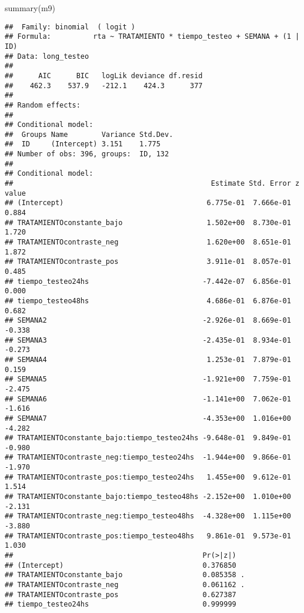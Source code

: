 \documentclass[
]{article}
\newenvironment{Shaded}{\begin{snugshade}}{\end{snugshade}}
\newcommand{\FunctionTok}[1]{\textcolor[rgb]{0.00,0.00,0.00}{#1}}
\newcommand{\NormalTok}[1]{#1}
\begin{document}
\begin{Shaded}
\begin{Highlighting}[]
\FunctionTok{summary}\NormalTok{(m9)}
\end{Highlighting}
\end{Shaded}

\begin{verbatim}
##  Family: binomial  ( logit )
## Formula:          rta ~ TRATAMIENTO * tiempo_testeo + SEMANA + (1 | ID)
## Data: long_testeo
## 
##      AIC      BIC   logLik deviance df.resid 
##    462.3    537.9   -212.1    424.3      377 
## 
## Random effects:
## 
## Conditional model:
##  Groups Name        Variance Std.Dev.
##  ID     (Intercept) 3.151    1.775   
## Number of obs: 396, groups:  ID, 132
## 
## Conditional model:
##                                               Estimate Std. Error z value
## (Intercept)                                  6.775e-01  7.666e-01   0.884
## TRATAMIENTOconstante_bajo                    1.502e+00  8.730e-01   1.720
## TRATAMIENTOcontraste_neg                     1.620e+00  8.651e-01   1.872
## TRATAMIENTOcontraste_pos                     3.911e-01  8.057e-01   0.485
## tiempo_testeo24hs                           -7.442e-07  6.856e-01   0.000
## tiempo_testeo48hs                            4.686e-01  6.876e-01   0.682
## SEMANA2                                     -2.926e-01  8.669e-01  -0.338
## SEMANA3                                     -2.435e-01  8.934e-01  -0.273
## SEMANA4                                      1.253e-01  7.879e-01   0.159
## SEMANA5                                     -1.921e+00  7.759e-01  -2.475
## SEMANA6                                     -1.141e+00  7.062e-01  -1.616
## SEMANA7                                     -4.353e+00  1.016e+00  -4.282
## TRATAMIENTOconstante_bajo:tiempo_testeo24hs -9.648e-01  9.849e-01  -0.980
## TRATAMIENTOcontraste_neg:tiempo_testeo24hs  -1.944e+00  9.866e-01  -1.970
## TRATAMIENTOcontraste_pos:tiempo_testeo24hs   1.455e+00  9.612e-01   1.514
## TRATAMIENTOconstante_bajo:tiempo_testeo48hs -2.152e+00  1.010e+00  -2.131
## TRATAMIENTOcontraste_neg:tiempo_testeo48hs  -4.328e+00  1.115e+00  -3.880
## TRATAMIENTOcontraste_pos:tiempo_testeo48hs   9.861e-01  9.573e-01   1.030
##                                             Pr(>|z|)    
## (Intercept)                                 0.376850    
## TRATAMIENTOconstante_bajo                   0.085358 .  
## TRATAMIENTOcontraste_neg                    0.061162 .  
## TRATAMIENTOcontraste_pos                    0.627387    
## tiempo_testeo24hs                           0.999999    

\end{verbatim}
\end{document}
